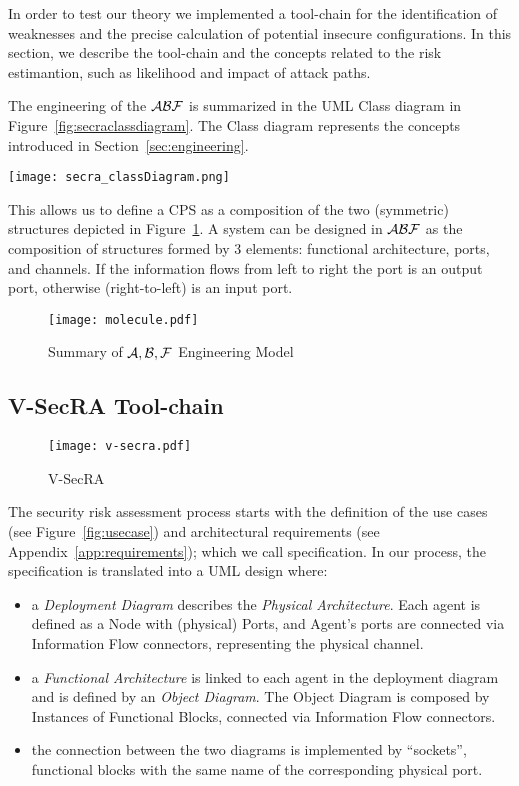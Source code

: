 In order to test our theory we implemented a tool-chain for
the identification of weaknesses and the precise calculation of 
potential insecure configurations. In this section, we describe
the tool-chain and the concepts related to the risk estimantion, 
such as likelihood and impact of attack paths.

The engineering of the $\mathcal{A}\mathcal{B}\mathcal{F}$ is summarized in the UML Class
diagram in Figure~\ref{fig:secraclassdiagram}. The Class diagram
represents the concepts introduced in Section~\ref{sec:engineering}.
\begin{sidewaysfigure}
	\centering
	\texttt{[image: secra\_classDiagram.png]}
	\caption{Security Risk Assessment -- Class Diagram}
	\label{fig:secraclassdiagram}
\end{sidewaysfigure}
This allows us to define a CPS as a composition of the two (symmetric)
structures depicted in Figure~\ref{fig:molecules}. A system can be
designed in $\mathcal{A}\mathcal{B}\mathcal{F}$ as the composition of structures formed
by 3 elements: functional architecture, ports, and channels.
If the information flows from left to right the port is an output port,
otherwise (right-to-left) is an input port.
\begin{figure}
	\centering
	\texttt{[image: molecule.pdf]}
	\caption{Summary of $\mathcal{A},\mathcal{B},\mathcal{F}$ Engineering Model}
	\label{fig:molecules}
\end{figure}

\subsection{V-SecRA Tool-chain}
\begin{figure}
	\centering
	\texttt{[image: v-secra.pdf]}
	\caption{V-SecRA}
	\label{fig:v-secra}
\end{figure}
The security risk assessment process starts with the definition
of the use cases (see Figure~\ref{fig:usecase}) and architectural requirements 
(see Appendix~\ref{app:requirements}); which we call specification.
In our process, the specification is translated into a UML design where:
\begin{itemize}
	\item a \emph{Deployment Diagram} describes the \emph{Physical
		Architecture}. Each agent is defined as a Node with (physical)
		Ports, and Agent's ports are connected via Information Flow
		connectors, representing the physical channel.
	\item a \emph{Functional Architecture} is linked to each agent in the
		deployment diagram and is defined by an \emph{Object Diagram}.
		The Object Diagram is composed by Instances of Functional
		Blocks, connected via Information Flow connectors.
	\item the connection between the two diagrams is implemented by
		``sockets'', functional blocks with the same name of the
		corresponding physical port.
\end{itemize}

